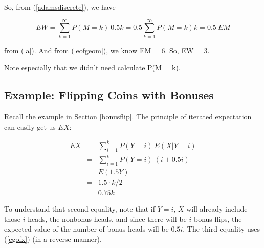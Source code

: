 So, from (\ref{adamsdiscrete}), we have

\begin{equation}
EW = \sum_{k=1}^\infty P(M = k) ~ 0.5 k 
= 0.5 \sum_{k=1}^\infty P(M = k) k
= 0.5 ~ EM
\end{equation}

from (\ref{a}).  And from (\ref{eofgeom}), we know EM = 6.  So, EW = 3.

Note especially that we didn't need calculate P(M = k).

\subsection{Example: Flipping Coins with Bonuses}

Recall the example in Section \ref{bonusflip}.  The principle of
iterated expectation can easily get us $EX$:

\begin{eqnarray}
EX &=& \sum_{i=1}^k P(Y = i) ~ E(X | Y = i) \\
   &=& \sum_{i=1}^k P(Y = i) ~ (i + 0.5i) \\
   &=& E(1.5Y) \\
   &=& 1.5 \cdot k/2 \\
   &=& 0.75k
\end{eqnarray}

To understand that second equality, note that if $Y = i$, $X$ will
already include those $i$ heads, the nonbonus heads, and since there
will be $i$ bonus flips, the expected value of the number of bonus heads
will be $0.5 i$.  The third equality uses (\ref{egofx}) (in a reverse
manner).

